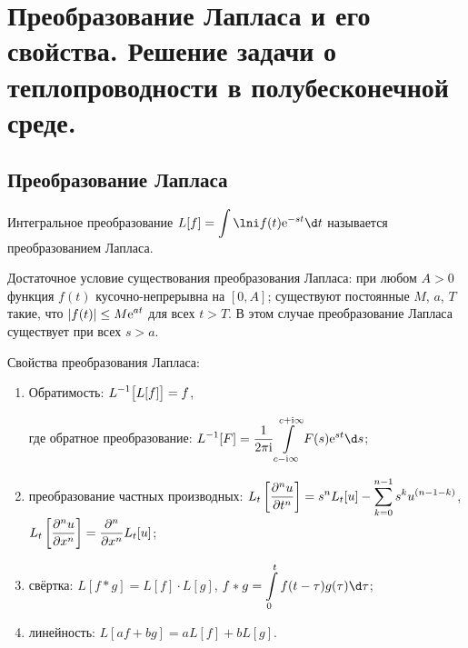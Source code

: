 \chapter{Преобразование Лапласа и его свойства. Решение задачи о
теплопроводности в полубесконечной среде.}

\section{Преобразование Лапласа}
Интегральное преобразование \( \ds L[f] = \int\lni f(t)\e^{-st}\d t \)
называется преобразованием Лапласа.

Достаточное условие существования преобразования Лапласа: при любом \( A > 0 \)
функция \( f(t) \) кусочно-непрерывна на \( [0, A] \); существуют постоянные
\( M \), \( a \), \( T \) такие, что \( \displaystyle |f(t)| \le M\mathrm{e}^{at} \) для всех
\( t > T \). В этом случае преобразование Лапласа существует при всех
\( s > a \).

Свойства преобразования Лапласа:
\begin{enumerate}
    \item Обратимость: \( \displaystyle L^{-1}\bigl[L[f]\bigr] = f \),
    
    где обратное преобразование: \( \ds L^{-1}[F] = \frac{1}{2\pi\i}
    \int\limits_{c-\i\infty}^{c+\i\infty} F(s)\e^{st}\d s \);
    
    \item преобразование частных производных:
    \( \displaystyle L_t\left[\frac{\partial^{n} u}{\partial t^{n}}\right] = s^nL_t[u] - \sum\limits_{k=0}^{n-1}
    s^k u^{(n - 1 - k)} \),
    \( \displaystyle L_t\left[\frac{\partial^{n} u}{\partial x^{n}}\right] = \frac{\partial^{n} }{\partial x^{n}}L_t[u] \);
    
    \item свёртка: \( L[f*g] = L[f]\cdot L[g] \),
    \( \ds f*g = \int\limits_0^t f(t-\tau)g(\tau)\d\tau \);
    
    \item линейность: \( L[af + bg] = aL[f] + bL[g] \).
\end{enumerate}

